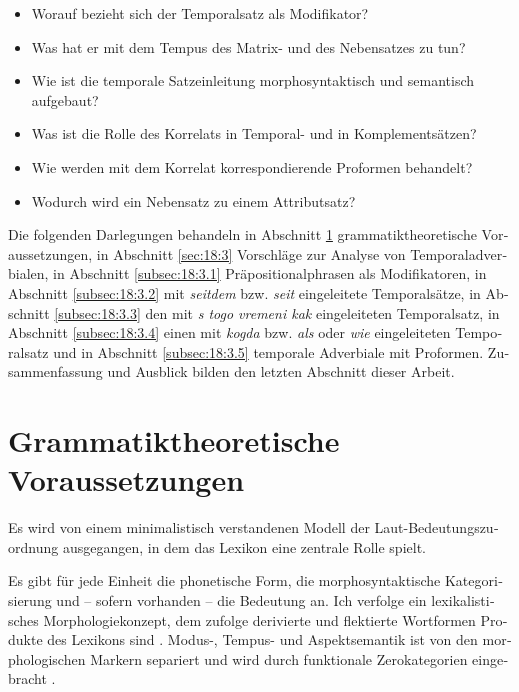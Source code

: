 \documentclass[output=paper, colorlinks, citecolor=brown, booklanguage=german]{langscibook}
\begin{document}
\begin{otherlanguage}{german}
\begin{itemize} 
\item Worauf bezieht sich der Temporalsatz als Modifikator?
\item Was hat er mit dem Tempus des Matrix- und des Nebensatzes zu tun? 
\item Wie ist die temporale Satzeinleitung morphosyntaktisch und semantisch
aufgebaut? 
\item Was ist die Rolle des Korrelats in Temporal- und in Komplementsätzen?
\item Wie werden mit dem Korrelat korrespondierende Proformen behandelt? 
\item Wodurch wird ein Nebensatz zu einem Attributsatz?
\end{itemize}

\noindent Die folgenden Darlegungen behandeln in Abschnitt \ref{sec:18:2} grammatiktheoretische Voraussetzungen, in  Abschnitt \ref{sec:18:3} Vorschläge zur Analyse von Temporaladverbialen, in Abschnitt \ref{subsec:18:3.1} Präpositionalphrasen als Modifikatoren, in Abschnitt \ref{subsec:18:3.2} mit \textit{seitdem} bzw. \textit{seit} eingeleitete Temporalsätze, in Abschnitt \ref{subsec:18:3.3} den mit \textit{s togo vremeni kak} eingeleiteten Temporalsatz, in Abschnitt \ref{subsec:18:3.4} einen mit \textit{kogda} bzw. \textit{als} oder \textit{wie} eingeleiteten Temporalsatz und in Abschnitt  \ref{subsec:18:3.5} temporale Adverbiale mit Proformen. Zusammenfassung und Ausblick bilden den letzten Abschnitt dieser Arbeit.

\section{Grammatiktheoretische Voraussetzungen} \label{sec:18:2}

\noindent Es wird von einem minimalistisch verstandenen Modell der Laut-Bedeu\-tungs\-zuord\-nung ausgegangen, in dem das Lexikon eine zentrale Rolle spielt.

Es gibt für jede Einheit die phonetische Form, die morphosyntaktische Kategorisierung und -- sofern vorhanden -- die Bedeutung an. Ich verfolge ein le\-xi\-ka\-li\-sti\-sches Morphologiekonzept, dem zufolge derivierte und flektierte Wortformen Produkte des Lexikons sind \citep{Wunderlich1997}. Modus-, Tempus- und Aspekt\-semantik ist von den morphologischen Markern separiert und wird durch funktionale Zerokategorien eingebracht \citep{Zeijlstra2004,Gronn-Stechow2010,Gronn-Stechow2012,Gronn-Stechow2013a,Stechow-Gronn2013,Pitsch2014,Pitsch2014a,Zimmermann1990,Zimmermann2013,Zimmermann2015a}.


\end{otherlanguage}
\end{document}
